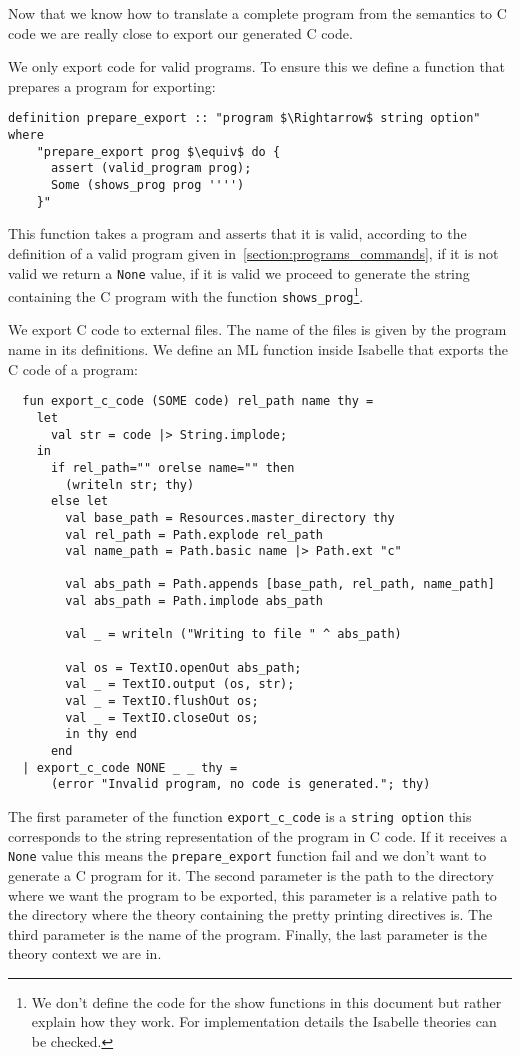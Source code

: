 Now that we know how to translate a complete program from the semantics to C code we are really close to export our generated C code.

We only export code for valid programs.
To ensure this we define a function that prepares a program for exporting:

\begin{lstlisting}[mathescape=true]
  definition prepare_export :: "program $\Rightarrow$ string option" where
    "prepare_export prog $\equiv$ do {
      assert (valid_program prog);
      Some (shows_prog prog '''')
    }"
\end{lstlisting}


This function takes a program and asserts that it is valid, according to the definition of a valid program given in~\ref{section:programs_commands}, if it is not valid we return a \verb|None| value, if it is valid we proceed to generate the string containing the C program with the function \verb|shows_prog|\footnote{We don't define the code for the show functions in this document but rather explain how they work. For implementation details the Isabelle theories can be checked.}.

We export C code to external files.
The name of the files is given by the program name in its definitions.
We define an ML function inside Isabelle that exports the C code of a program:


\begin{lstlisting}
  fun export_c_code (SOME code) rel_path name thy =
    let 
      val str = code |> String.implode;
    in
      if rel_path="" orelse name="" then
        (writeln str; thy)
      else let  
        val base_path = Resources.master_directory thy
        val rel_path = Path.explode rel_path
        val name_path = Path.basic name |> Path.ext "c"
      
        val abs_path = Path.appends [base_path, rel_path, name_path]
        val abs_path = Path.implode abs_path
     
        val _ = writeln ("Writing to file " ^ abs_path)
 
        val os = TextIO.openOut abs_path;
        val _ = TextIO.output (os, str);
        val _ = TextIO.flushOut os;
        val _ = TextIO.closeOut os;
        in thy end  
      end
  | export_c_code NONE _ _ thy = 
      (error "Invalid program, no code is generated."; thy)
\end{lstlisting}

The first parameter of the function \verb|export_c_code| is a \verb|string option| this corresponds to the string representation of the program in C code.
If it receives a \verb|None| value this means the \verb|prepare_export| function fail and we don't want to generate a C program for it.
The second parameter is the path to the directory where we want the program to be exported, this parameter is a relative path to the directory where the theory containing the pretty printing directives is.
The third parameter is the name of the program.
Finally, the last parameter is the theory context we are in.

